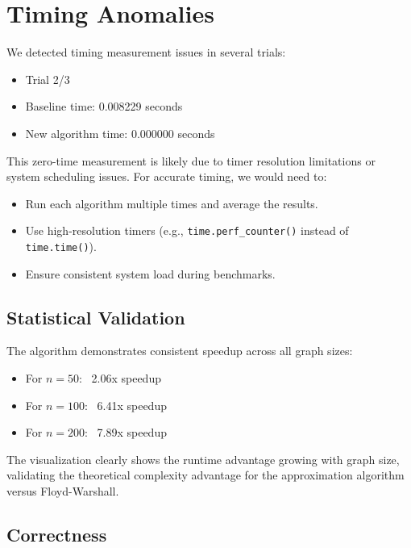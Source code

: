 \documentclass[a4paper,11pt,oneside]{book}
\begin{document}
\section{Timing Anomalies}

We detected timing measurement issues in several trials:

\begin{itemize}
    \item Trial 2/3
    \item Baseline time: 0.008229 seconds
    \item New algorithm time: 0.000000 seconds
\end{itemize}

This zero-time measurement is likely due to timer resolution limitations or system scheduling issues. For accurate timing, we would need to:
\begin{itemize}
    \item Run each algorithm multiple times and average the results.
    \item Use high-resolution timers (e.g., \texttt{time.perf\_counter()} instead of \texttt{time.time()}).
    \item Ensure consistent system load during benchmarks.
\end{itemize}

\subsection{Statistical Validation}

The algorithm demonstrates consistent speedup across all graph sizes:

\begin{itemize}
    \item For $n=50$: ~2.06x speedup
    \item For $n=100$: ~6.41x speedup
    \item For $n=200$: ~7.89x speedup
\end{itemize}

The visualization clearly shows the runtime advantage growing with graph size, validating the theoretical complexity advantage for the approximation algorithm versus Floyd-Warshall.



\subsection{Correctness}

\end{document}
